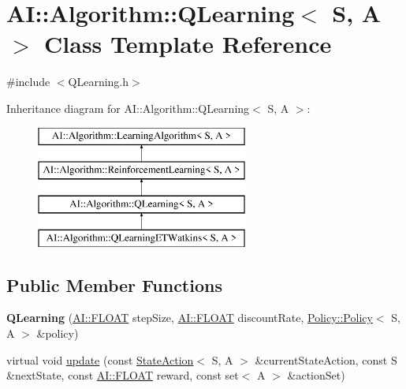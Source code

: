 \hypertarget{classAI_1_1Algorithm_1_1QLearning}{\section{A\-I\-:\-:Algorithm\-:\-:Q\-Learning$<$ S, A $>$ Class Template Reference}
\label{classAI_1_1Algorithm_1_1QLearning}
}


{\ttfamily \#include $<$Q\-Learning.\-h$>$}

Inheritance diagram for A\-I\-:\-:Algorithm\-:\-:Q\-Learning$<$ S, A $>$\-:\begin{figure}[H]
\begin{center}
\leavevmode
\includegraphics[height=4.000000cm]{classAI_1_1Algorithm_1_1QLearning}
\end{center}
\end{figure}
\subsection*{Public Member Functions}
\begin{DoxyCompactItemize}
\item 
\hypertarget{classAI_1_1Algorithm_1_1QLearning_a182fd44ac6cd6b2474615ce7b98667ce}{{\bfseries Q\-Learning} (\hyperlink{namespaceAI_a41b74884a20833db653dded3918e05c3}{A\-I\-::\-F\-L\-O\-A\-T} step\-Size, \hyperlink{namespaceAI_a41b74884a20833db653dded3918e05c3}{A\-I\-::\-F\-L\-O\-A\-T} discount\-Rate, \hyperlink{classAI_1_1Algorithm_1_1Policy_1_1Policy}{Policy\-::\-Policy}$<$ S, A $>$ \&policy)}\label{classAI_1_1Algorithm_1_1QLearning_a182fd44ac6cd6b2474615ce7b98667ce}

\item 
virtual void \hyperlink{classAI_1_1Algorithm_1_1QLearning_a042e1987ce21a94f59603c4cb1eeed82}{update} (const \hyperlink{classAI_1_1StateAction}{State\-Action}$<$ S, A $>$ \&current\-State\-Action, const S \&next\-State, const \hyperlink{namespaceAI_a41b74884a20833db653dded3918e05c3}{A\-I\-::\-F\-L\-O\-A\-T} reward, const set$<$ A $>$ \&action\-Set)
\end{DoxyCompactItemize}
